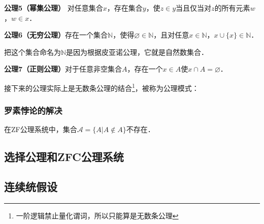 \textbf{公理5（幂集公理）} 对任意集合$x$，存在集合$y$，使$z\in y$当且仅当对$z$的所有元素$w$，$w\in x$．

\textbf{公理6（无穷公理）}存在一个集合$\mathbb{N}$，使得$\varnothing\in\mathbb{N}$，且对任意$x\in \mathbb{N}$，$x\cup\{x\}\in\mathbb{N}$．

把这个集合命名为$\mathbb{N}$是因为根据皮亚诺公理，它就是自然数集合．

\textbf{公理7（正则公理）}对于任意非空集合$A$，存在一个$x\in A$使$x\cap A=\varnothing$．

接下来的公理实际上是无数条公理的结合\footnote{一阶逻辑禁止量化谓词，所以只能算是无数条公理}，被称为公理模式：


\subsubsection{罗素悖论的解决}
\begin{theorem}{}
在ZF公理系统中，集合$\mathcal{A}=\{A|A\notin A\}$不存在．
\end{theorem}


\subsection{选择公理和ZFC公理系统}

\subsection{连续统假设}



